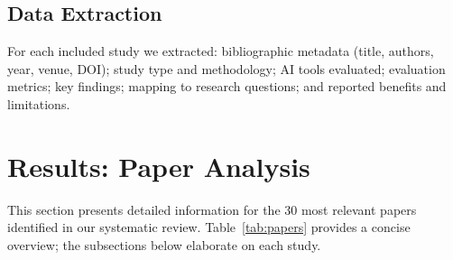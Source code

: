 \documentclass[journal,twoside,10pt]{IEEEtran}
\begin{document}
\subsection{Data Extraction}

For each included study we extracted: bibliographic metadata (title, authors,
year, venue, DOI); study type and methodology; AI tools evaluated; evaluation
metrics; key findings; mapping to research questions; and reported benefits and
limitations.

\section{Results: Paper Analysis}
\label{sec:results}

This section presents detailed information for the 30 most relevant papers
identified in our systematic review. Table~\ref{tab:papers} provides a concise
overview; the subsections below elaborate on each study.
\end{document}
